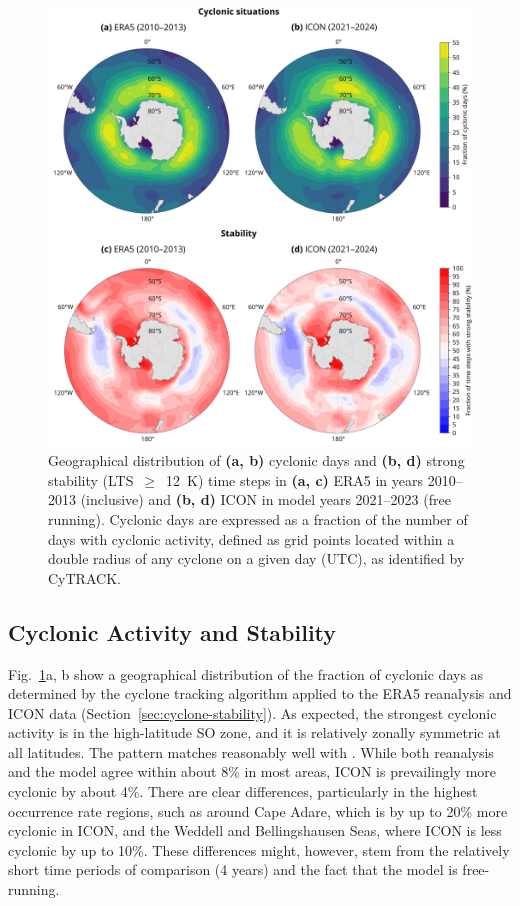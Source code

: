 \documentclass[draft]{agujournal2019}
\begin{document}
\begin{figure}[p!]
\centering
\includegraphics[width=\textwidth]{img/cyc_stab_dist.pdf}
\caption{
Geographical distribution of \textbf{(a, b)} cyclonic days and \textbf{(b, d)} strong stability (LTS~$\geq$~12~K) time steps in \textbf{(a, c)} ERA5 in years 2010--2013 (inclusive) and \textbf{(b, d)} ICON in model years 2021--2023 (free running). Cyclonic days are expressed as a fraction of the number of days with cyclonic activity, defined as grid points located within a double radius of any cyclone on a given day (UTC), as identified by CyTRACK.
}
\label{fig:cyclone-stability}
\end{figure}

\subsection{Cyclonic Activity and Stability}

Fig.~\ref{fig:cyclone-stability}a, b show a geographical distribution of the fraction of cyclonic days as determined by the cyclone tracking algorithm applied to the ERA5 reanalysis and ICON data (Section~\ref{sec:cyclone-stability}). As expected, the strongest cyclonic activity is in the high-latitude SO zone, and it is relatively zonally symmetric at all latitudes. The pattern matches reasonably well with . While both reanalysis and the model agree within about 8\% in most areas, ICON is prevailingly more cyclonic by about 4\%. There are clear differences, particularly in the highest occurrence rate regions, such as around Cape Adare, which is by up to 20\% more cyclonic in ICON, and the Weddell and Bellingshausen Seas, where ICON is less cyclonic by up to 10\%. These differences might, however, stem from the relatively short time periods of comparison (4 years) and the fact that the model is free-running.
\end{document}
